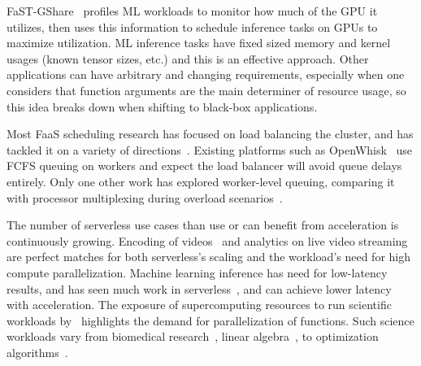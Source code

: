 FaST-GShare~\cite{gu2023fast} profiles ML workloads to monitor how much of the GPU it utilizes, then uses this information to schedule inference tasks on GPUs to maximize utilization.
ML inference tasks have fixed sized memory and kernel usages (known tensor sizes, etc.) and this is an effective approach.
Other applications can have arbitrary and changing requirements, especially when one considers that function arguments are the main determiner of resource usage, so this idea breaks down when shifting to black-box applications.

Most FaaS scheduling research has focused on load balancing the cluster, and has tackled it on a variety of directions~\cite{kaffes_hermod_2022, kim_scheduling_2021, abdi2023palette, package-cristina-19, serverless-harvest-sosp21, faaslb-hpdc22}.
Existing platforms such as OpenWhisk~\cite{openwhisk} use FCFS queuing on workers and expect the load balancer will avoid queue delays entirely.
Only one other work has explored worker-level queuing, comparing it with processor multiplexing during overload scenarios~\cite{kaffes2021practical}.


The number of serverless use cases than use or can benefit from acceleration is continuously growing.
Encoding of videos~\cite{ao2018sprocket, zhang2019video} and analytics on live video streaming~\cite{romero2021llama, risco2021gpu} are perfect matches for both serverless's scaling and the workload's need for high compute parallelization.
Machine learning inference has need for low-latency results, and has seen much work in serverless~\cite{yang2022infless, ali2022optimizing, ali_batch_2020}, and can achieve lower latency with acceleration.
%
The exposure of supercomputing resources to run scientific workloads by~\cite{funcx_hpdc_20} highlights the demand for parallelization of functions.
Such science workloads vary from biomedical research~\cite{kumanov2018serverless,hung2019rapid}, linear algebra~\cite{werner2018serverless,shankar2020serverless}, to optimization algorithms~\cite{aytekin2019harnessing}.

